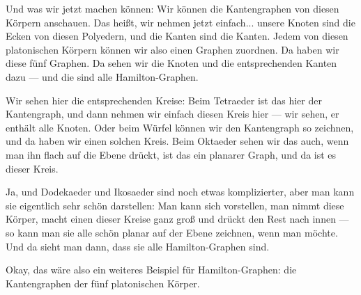 \begin{spoken-clean}[00:35:31 - 00:37:58]
Und was wir jetzt machen können: Wir können die Kantengraphen von diesen Körpern anschauen. Das heißt, wir nehmen jetzt einfach... unsere Knoten sind die Ecken von diesen Polyedern, und die Kanten sind die Kanten. Jedem von diesen platonischen Körpern können wir also einen Graphen zuordnen. Da haben wir diese fünf Graphen. Da sehen wir die Knoten und die entsprechenden Kanten dazu --- und die sind alle Hamilton-Graphen.

Wir sehen hier die entsprechenden Kreise: Beim Tetraeder ist das hier der Kantengraph, und dann nehmen wir einfach diesen Kreis hier --- wir sehen, er enthält alle Knoten. Oder beim Würfel können wir den Kantengraph so zeichnen, und da haben wir einen solchen Kreis. Beim Oktaeder sehen wir das auch, wenn man ihn flach auf die Ebene drückt, ist das ein planarer Graph, und da ist es dieser Kreis.

Ja, und Dodekaeder und Ikosaeder sind noch etwas komplizierter, aber man kann sie eigentlich sehr schön darstellen: Man kann sich vorstellen, man nimmt diese Körper, macht einen dieser Kreise ganz groß und drückt den Rest nach innen --- so kann man sie alle schön planar auf der Ebene zeichnen, wenn man möchte. Und da sieht man dann, dass sie alle Hamilton-Graphen sind.

Okay, das wäre also ein weiteres Beispiel für Hamilton-Graphen: die Kantengraphen der fünf platonischen Körper.
\end{spoken-clean}

